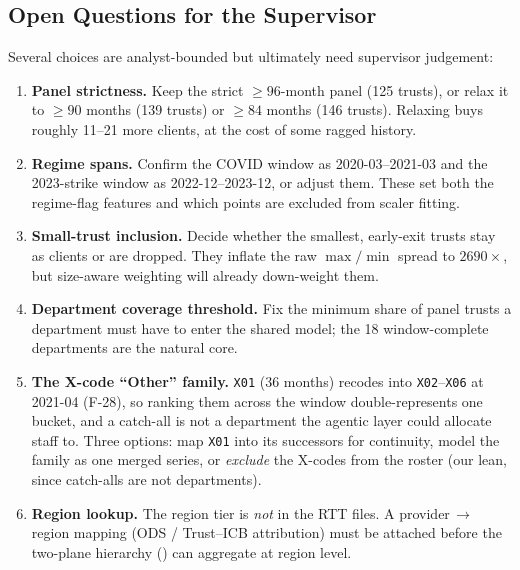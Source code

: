 \documentclass[11pt,a4paper]{article}
\begin{document}
\subsection{Open Questions for the Supervisor}
Several choices are analyst-bounded but ultimately need supervisor judgement:
\begin{enumerate}[nosep]
  \item \textbf{Panel strictness.} Keep the strict $\geq 96$-month panel (125 trusts), or relax it to $\geq 90$ months (139 trusts) or $\geq 84$ months (146 trusts). Relaxing buys roughly 11--21 more clients, at the cost of some ragged history.
  \item \textbf{Regime spans.} Confirm the COVID window as 2020-03--2021-03 and the 2023-strike window as 2022-12--2023-12, or adjust them. These set both the regime-flag features and which points are excluded from scaler fitting.
  \item \textbf{Small-trust inclusion.} Decide whether the smallest, early-exit trusts stay as clients or are dropped. They inflate the raw $\max/\min$ spread to $2690\times$, but size-aware weighting will already down-weight them.
  \item \textbf{Department coverage threshold.} Fix the minimum share of panel trusts a department must have to enter the shared model; the 18 window-complete departments are the natural core.
  \item \textbf{The X-code ``Other'' family.} \texttt{X01} (36 months) recodes into \texttt{X02}--\texttt{X06} at 2021-04 (F-28), so ranking them across the window double-represents one bucket, and a catch-all is not a department the agentic layer could allocate staff to. Three options: map \texttt{X01} into its successors for continuity, model the family as one merged series, or \emph{exclude} the X-codes from the roster (our lean, since catch-alls are not departments).
  \item \textbf{Region lookup.} The region tier is \emph{not} in the RTT files. A provider\,$\rightarrow$\,region mapping (ODS / Trust--ICB attribution) must be attached before the two-plane hierarchy () can aggregate at region level.
\end{enumerate}
\end{document}

